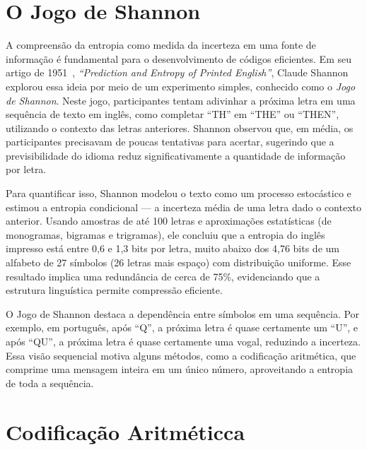\section{O Jogo de Shannon}

A compreensão da entropia como medida da incerteza em uma fonte de informação é
fundamental para o desenvolvimento de códigos eficientes. Em seu artigo de
1951~\parencite{Shannon1951}, \textit{``Prediction and Entropy of Printed English''}, Claude Shannon
explorou essa ideia por meio de um experimento simples,
conhecido como o \emph{Jogo de Shannon}. Neste jogo, participantes tentam adivinhar a
próxima letra em uma sequência de texto em inglês, como completar ``TH'' em
``THE'' ou ``THEN'', utilizando o contexto das letras anteriores. Shannon
observou que, em média, os participantes precisavam de poucas tentativas para
acertar, sugerindo que a previsibilidade do idioma reduz significativamente a
quantidade de informação por letra.

Para quantificar isso, Shannon modelou o texto como um processo estocástico e
estimou a entropia condicional --- a incerteza média de uma letra dado o
contexto anterior. Usando amostras de até 100 letras e aproximações estatísticas
(de monogramas, bigramas e trigramas), ele concluiu que a entropia do inglês impresso
está entre 0{,}6 e 1{,}3 bits por letra, muito abaixo dos 4{,}76 bits de um alfabeto
de 27 símbolos (26 letras mais espaço) com distribuição uniforme. Esse
resultado implica uma redundância de cerca de 75\%, evidenciando que a
estrutura linguística permite compressão eficiente.

O Jogo de Shannon destaca a
dependência entre símbolos em uma sequência. Por exemplo, em português, após ``Q'', a 
próxima letra é quase certamente um ``U'', e após ``QU'', a
próxima letra é quase certamente uma vogal, reduzindo a incerteza. Essa visão
sequencial motiva alguns métodos, como a codificação aritmética, que
comprime uma mensagem inteira em um único número, aproveitando a entropia de
toda a sequência.









\section{Codificação Aritméticca}

